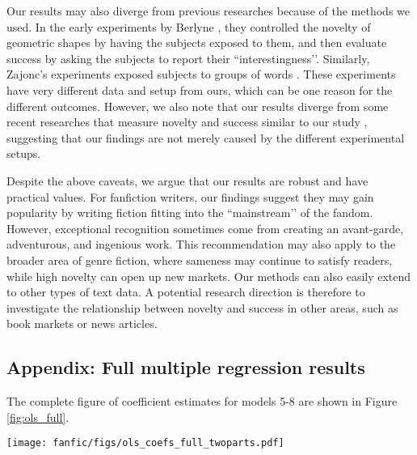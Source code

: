 \documentclass[letterpaper]{article} %
\begin{document}
Our results may also diverge from previous researches because of the methods we used. In the early experiments by Berlyne \cite{berlyne1970novelty}, they controlled the novelty of geometric shapes by having the subjects exposed to them, and then evaluate success by asking the subjects to report their ``interestingness’’. Similarly, Zajonc’s experiments exposed subjects to groups of words \cite{zajonc1968attitudinal}. These experiments have very different data and setup from ours, which can be one reason for the different outcomes. However, we also note that our results diverge from some recent researches that measure novelty and success similar to our study \cite{horvat2018role,askin2017makes}, suggesting that our findings are not merely caused by the different experimental setups.


Despite the above caveats, we argue that our results are robust and have practical values. For fanfiction writers, our findings suggest they may gain popularity by writing fiction fitting into the ``mainstream’’ of the fandom. However, exceptional recognition sometimes come from creating an avant-garde, adventurous, and ingenious work. This recommendation may also apply to the broader area of genre fiction, where sameness may continue to satisfy readers, while high novelty can open up new markets. Our methods can also easily extend to other types of text data. A potential research direction is therefore to investigate the relationship between novelty and success in other areas, such as book markets or news articles.





\appendix

\subsection{Appendix: Full multiple regression results}
The complete figure of coefficient estimates for models 5-8 are shown in Figure \ref{fig:ols_full}.

\begin{figure*}
    \centering
          \texttt{[image: fanfic/figs/ols\_coefs\_full\_twoparts.pdf]}
        \caption{OLS coefficients for models 5-8. 95\% confidence intervals are shown. N = 662793.}
        \label{fig:ols_full}
\end{figure*}
\end{document}
